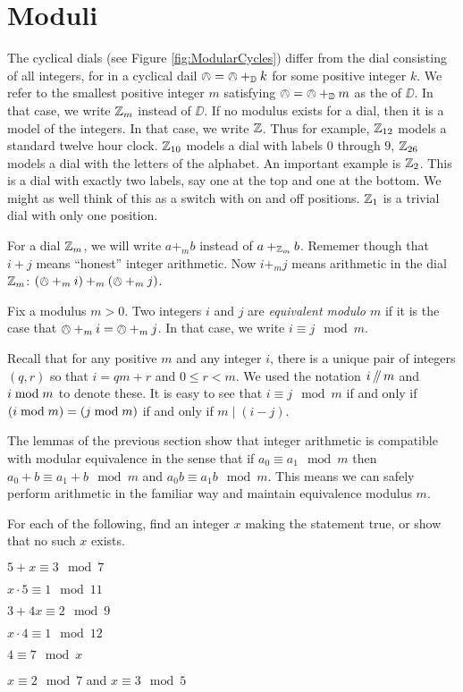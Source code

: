 \section*{Moduli}

The cyclical dials (see Figure \ref{fig:ModularCycles}) differ from the dial consisting of all integers, for in a cyclical dail $\owedge = \owedge +_{\mathbb D} k$ for some positive integer $k$. We refer to the smallest positive integer $m$ satisfying $\owedge = \owedge +_{\mathbb D} m$ as the  of $\DD$. In that case, we write ${\mathbb Z}_m$ instead of $\DD$. If no modulus exists for a dial, then it is a model of the integers. In that case, we write ${\mathbb Z}$. 
Thus for example, ${\mathbb Z}_{12}$ models a standard twelve hour clock. ${\mathbb Z}_{10}$ models a dial with labels $0$ through $9$, ${\mathbb Z}_{26}$ models a dial with the letters of the alphabet. An important example is ${\mathbb Z}_2$. This is a dial with exactly two labels, say one at the top and one at the bottom. We might as well think of this as a switch with on and off positions. ${\mathbb Z}_1$ is a trivial dial with only one position.

For a dial ${\mathbb Z}_m$, we will write $a +_m b$ instead of $a +_{{\mathbb Z}_m} b$. Rememer though that $i+j$ means ``honest'' integer arithmetic. Now $i +_m j$ means arithmetic in the dial ${\mathbb Z}_m$: $(\owedge +_m i)+_m(\owedge +_m j)$. 

\begin{defn}\label{def:modulus}
	Fix a modulus $m>0$. Two integers $i$ and $j$ are \emph{equivalent modulo $m$} if it is the case that $\owedge +_m i = \owedge +_m j$. In that case, we write $i\equiv j\mod m$. 
\end{defn}

Recall that for any positive $m$ and any integer $i$, there is a unique pair of integers $(q,r)$ so that $i = qm + r$ and $0\leq r < m$. We used the notation $i\mathop{/\mkern-5mu/} m$ and $i\bmod m$ to denote these. It is easy to see that
$i \equiv j \mod m$ if and only if $(i\bmod m)=(j\bmod m)$ if and only if $m\mid (i-j)$.

The lemmas of the previous section show that integer arithmetic is compatible with modular equivalence in the sense that if $a_0\equiv a_1\mod m$ then $a_0 + b \equiv a_1 + b\mod m$ and $a_0b\equiv a_1b\mod m$. This means we can safely perform arithmetic in the familiar way and maintain equivalence modulus $m$. 

\begin{exer}
	For each of the following, find an integer $x$ making the statement true, or show that no such $x$ exists.
	\begin{exercise}
		\item $5 + x \equiv 3 \mod 7$
		\item $x\cdot 5\equiv 1 \mod 11$
		\item $3 + 4x \equiv 2\mod 9$
		\item $x\cdot 4 \equiv 1\mod 12$
		\item $4 \equiv 7 \mod x$
		\item $x\equiv 2\mod 7$ and $x\equiv 3\mod 5$
	\end{exercise}
\end{exer}

